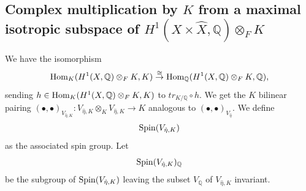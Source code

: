 \documentclass[12pt]{amsart}
\newcommand{\hide}[1]{}
\numberwithin{equation}{subsection}
\theoremstyle{plain}
\newtheorem{lem}[thm]{Lemma}
\theoremstyle{definition}
\newcommand{\QQ}{{\mathbb Q}}
\newcommand{\RR}{{\mathbb R}}
\newcommand{\Spin}{{\rm Spin}}
\newcommand{\IsomRightArrow}{\stackrel{\cong}{\rightarrow}}
\newcommand{\Hom}{{\rm Hom}}
\begin{document}
{%
\hide{
Set $(S\otimes S)_{\hat{\eta}}:=(S_\QQ\otimes_\QQ S_\QQ)\cap [\sum_{\hat{\sigma}\in\hat{\Sigma}}S_{\hat{\sigma}}\otimes_\RR S_{\hat{\sigma}}]$.

\begin{lem}
\label{lemma-Chevalley-isomorphism-over-F} (??? needs to be corrected using Remark \ref{rem-image-via-varphi-of-top-wedge-over-F-of-a-maximal-isotropic-F-subspace} ???)
The isomorphism 
\[
\phi\circ (id\otimes\tau):S_\QQ\otimes_\QQ S_\QQ\rightarrow \wedge^*V_\QQ,
\] 
where $\phi$ is
given in (\ref{eq-phi-introduction}), 
restricts to an isomorphism of $(S\otimes S)_{\hat{\eta}}$ onto (???).
\end{lem}

\begin{proof}
The isomorphism $\phi\circ (id\otimes\tau)$ is $\Spin(V)$-equivariant, by Proposition \ref{prop-the-orlov-image-of-HW-P-projects-into-the-3-dimensional-space-of-HW-classes}, and is hence also $\Spin(V_{\hat{\eta}})$-equivariant. Hence, it maps the irreducible $\Spin(V_{\hat{\eta}})$-sub-representation
$S_{\hat{\eta}}\otimes_F S_{\hat{\eta}}$ to a $\Spin(V_{\hat{\eta}})$-sub-representation of $\wedge^*_FV_{\hat{\eta}}$. (??? show that the restriction is an isomorphism of $F$-vector spaces and that the multiplicity of $\wedge^*_FV_{\hat{\eta}}$ in $\wedge^*_\QQ V_\QQ$ is $1$ ???)
Note that $\wedge^*_FV_{\hat{\eta}}\cong \wedge^*_FH^1(X,\QQ)\otimes_F \wedge^*_FH^1(\hat{X},\QQ)$
\end{proof}

}
% 
\subsection{Complex multiplication by $K$ from a maximal isotropic subspace of $H^1(X\times\hat{X},\QQ)\otimes_F K$}
\label{sec-complex-multiplication--by-CM-field-K}

We have the isomorphism
\[
\Hom_K(H^1(X,\QQ)\otimes_FK,K)\IsomRightArrow \Hom_\QQ(H^1(X,\QQ)\otimes_FK,\QQ), 
\]
sending $h\in\Hom_K(H^1(X,\QQ)\otimes_FK,K)$ to $tr_{K/\QQ}\circ h$. We get the $K$ bilinear pairing $(\bullet,\bullet)_{V_{\hat{\eta},K}}:V_{\hat{\eta},K}\otimes_K V_{\hat{\eta},K}\rightarrow K$ analogous to $(\bullet,\bullet)_{V_{\hat{\eta}}}$. 
We define 
\begin{equation}
\label{eq-Spin-V-K}
\Spin(V_{\hat{\eta},K})
\end{equation}
as the associated spin group. Let
\begin{equation}
\label{eq-Spin-V-Q-hat-eta-K}
\Spin(V_{\hat{\eta},K})_\QQ
\end{equation}
be the subgroup of $\Spin(V_{\hat{\eta},K})$ leaving the subset $V_\QQ$ of $V_{\hat{\eta},K}$  invariant.

}
\end{document}
